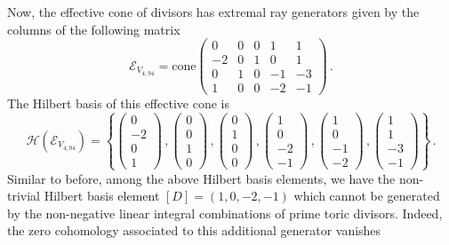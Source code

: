 \documentclass[11pt,dvipsnames]{article}
\theoremstyle{definition}
\begin{document}
Now, the effective cone of divisors has extremal ray generators given by the columns of the following matrix
\begin{equation}
    \mathcal{E}_{V_{4,94}} = \mathrm{cone}
    \begin{pmatrix}
        0&0&0&1&1\\
        -2&0&1&0&1\\
        0&1&0&-1&-3\\
        1&0&0&-2&-1
    \end{pmatrix}\,.
\end{equation}
The Hilbert basis of this effective cone is
\begin{equation}
    \mathcal{H}(\mathcal{E}_{V_{4,94}}) =\left\{
    \begin{pmatrix}
        0\\
        -2\\
        0\\
        1
    \end{pmatrix}\,,
    \begin{pmatrix}
        0\\
        0\\
        1\\
        0
    \end{pmatrix}\,,
    \begin{pmatrix}
        0\\
        1\\
        0\\
        0
    \end{pmatrix}\,,
    \begin{pmatrix}
        1\\
        0\\
        -2\\
        -1
    \end{pmatrix}\,,
    \begin{pmatrix}
        1\\
        0\\
        -1\\
        -2
    \end{pmatrix}\,,
    \begin{pmatrix}
        1\\
        1\\
        -3\\
        -1
    \end{pmatrix}
    \right\}\,.
\end{equation}
Similar to before, among the above Hilbert basis elements, we have the non-trivial Hilbert basis element $[D] = (1,0,-2,-1)$ which cannot be generated by the non-negative linear integral combinations of prime toric divisors. Indeed, the zero cohomology associated to this additional generator vanishes
\end{document}
